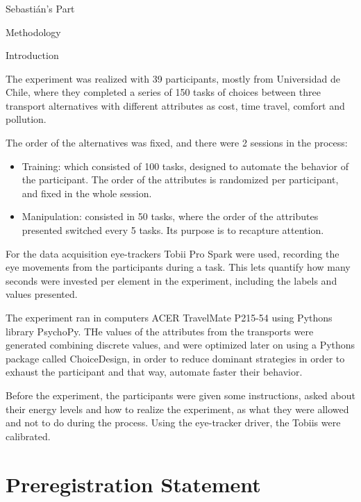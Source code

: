 \subsubsection{}\label{section-2}

Sebastián's Part

Methodology

Introduction

The experiment was realized with 39 participants, mostly from Universidad de Chile, where they completed a series of 150 tasks of choices between three transport alternatives with different attributes as cost, time travel, comfort and pollution.

The order of the alternatives was fixed, and there were 2 sessions in the process:

\begin{itemize}
\item
  Training: which consisted of 100 tasks, designed to automate the behavior of the participant. The order of the attributes is randomized per participant, and fixed in the whole session.
\item
  Manipulation: consisted in 50 tasks, where the order of the attributes presented switched every 5 tasks. It\textquotesingle s purpose is to recapture attention.
\end{itemize}

For the data acquisition eye-trackers Tobii Pro Spark were used, recording the eye movements from the participants during a task. This lets quantify how many seconds were invested per element in the experiment, including the labels and values presented.

The experiment ran in computers ACER TravelMate P215-54 using Python\textquotesingle s library PsychoPy. THe values of the attributes from the transports were generated combining discrete values, and were optimized later on using a Python\textquotesingle s package called ChoiceDesign, in order to reduce dominant strategies in order to exhaust the participant and that way, automate faster their behavior.

Before the experiment, the participants were given some instructions, asked about their energy levels and how to realize the experiment, as what they were allowed and not to do during the process. Using the eye-tracker driver, the Tobiis were calibrated.

\section{\texorpdfstring{ Preregistration Statement}{ Preregistration Statement}}\label{preregistration-statement}

